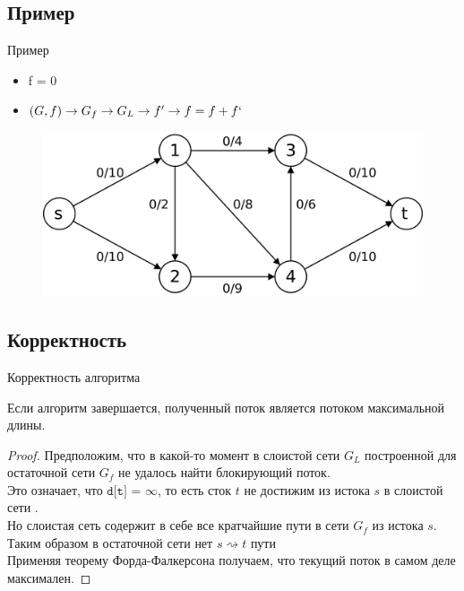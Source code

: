 \documentclass{beamer}
\begin{document}
\subsection{Пример}
\begin{frame}{Пример}
    \begin{itemize}
    \item {
        f = 0
    }
    \item {
            $(G, f) \rightarrow G_{f} \rightarrow G_{L} \rightarrow f' \rightarrow f = f + f`$
        }
    \end{itemize}

    \begin{figure}[h!]
        \centering
        \includegraphics[scale=0.15]{Dinic_algorithm_G1.png}
        \label{fig: example}
    \end{figure}
\end{frame}

\subsection{Корректность}
\begin{frame}{Корректность алгоритма}
    \begin{theorem}
        Если алгоритм завершается, полученный поток является потоком максимальной длины.
    \end{theorem}
    \pause
    \begin{proof}
        Предположим, что в какой-то момент в слоистой сети $G_{L}$ построенной для остаточной сети $G_f$ не удалось найти блокирующий поток.\\
        \pause
        Это означает, что $\texttt{d[t] = } \infty$, то есть сток $t$ не достижим из истока $s$ в слоистой сети .\\
        \pause
        Но слоистая сеть содержит в себе все кратчайшие пути в сети $G_{f}$ из истока $s$.\\
        \pause
        Таким образом в остаточной сети нет 
        $s \rightsquigarrow t$ пути\\
        \pause
        Применяя теорему Форда-Фалкерсона получаем, что текущий поток в самом деле максимален.
    \end{proof}
\end{frame}
\end{document}
